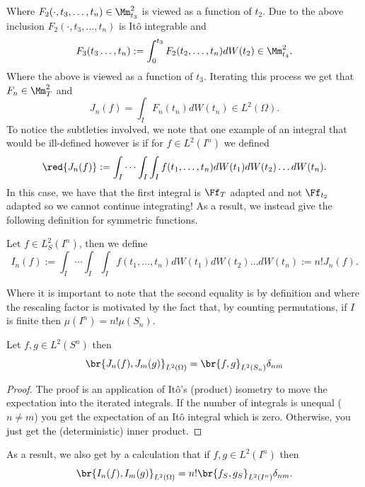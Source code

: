 \documentclass[
    a4paper,
    DIV=14,
    abstract=true,
    numbers=noenddot
]{scrartcl}
\begin{document}
Where $F_2(\cdot,t_3,\ldots,t_n)\in \Mm_{t_3}^2$ is viewed as a function of $t_2$. Due to the above inclusion $F_2(\cdot,t_3,\ldots,t_n)$ is Itô integrable and
\begin{equation*}
	F_3(t_3\ldots,t_n):=	\int_{0}^{t_3} F_2(t_2,\ldots,t_n)dW(t_2) \in \Mm_{t_4}^2  .
\end{equation*}
Where the above is viewed as a function of $t_3$. Iterating this process we get that $F_n \in \Mm_T^2$ and
\begin{equation*}
	J_n(f)=\int_I F_n(t_n)dW(t_n) \in L^2(\Omega).
\end{equation*}
To notice the subtleties involved, we note that one example of an integral that would be ill-defined however is if for $f\in L^2(I^n)$
we defined
\begin{equation*}
	\red{J_n(f)}:=\int_I\cdots \int_I\int_I f(t_1,\ldots,t_n)dW(t_1) dW(t_2)\ldots dW(t_n).
\end{equation*}
In this case, we have that the first integral is $\Ff_T$ adapted and not $\Ff_{t_2}$ adapted so we cannot continue integrating! As a result, we instead give the following definition for symmetric functions.
\begin{definition}
	Let $f\in L^2_S(I^n)$, then we define
	\begin{equation*}
		I_n(f):=\int_I\cdots \int_I\int_I f(t_1,\ldots,t_n)dW(t_1) dW(t_2)\ldots dW(t_n):=n! J_n(f).
	\end{equation*}
\end{definition}
Where it is important to note that the second equality is by definition and where the rescaling factor is motivated by the fact that, by counting permutations, if $I$ is finite then $\mu(I^n)=n! \mu(S_n)$.
\begin{proposition}\label{itosnthisometry}
	Let $f,g\in L^2(S^n)$ then
	\begin{equation*}
		\br{J_n(f),J_m(g)}_{L^2(\Omega)}=\br{f,g}_{L^2(S_n)}\delta_{nm}
	\end{equation*}
\end{proposition}
\begin{proof}
	The proof is an application of Itô's (product) isometry to move the expectation into the iterated integrals. If the number of integrals is unequal ($n\neq m$) you get the expectation of an Itô integral which is zero. Otherwise, you just get the (deterministic) inner product.
\end{proof}
As a result, we also get by a calculation that if $f,g\in L^2(I^n)$ then
\begin{equation*}
	\br{I_n(f),I_m(g)}_{L^2(\Omega)}=n!\br{f_S,g_S}_{L^2(I^n)}\delta_{nm}.
\end{equation*}
\end{document}
